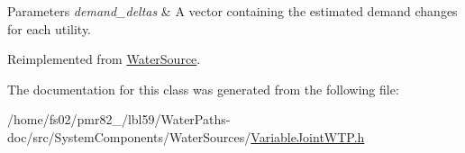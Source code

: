 \begin{DoxyParams}{Parameters}
{\em demand\+\_\+deltas} & A vector containing the estimated demand changes for each utility. \\
\hline
\end{DoxyParams}


Reimplemented from \mbox{\hyperlink{classWaterSource_afe2f6b96383abdb14563db279a261a31}{Water\+Source}}.



The documentation for this class was generated from the following file\+:\begin{DoxyCompactItemize}
\item 
/home/fs02/pmr82\+\_/lbl59/\+Water\+Paths-\/doc/src/\+System\+Components/\+Water\+Sources/\mbox{\hyperlink{VariableJointWTP_8h}{Variable\+Joint\+W\+T\+P.\+h}}\end{DoxyCompactItemize}

